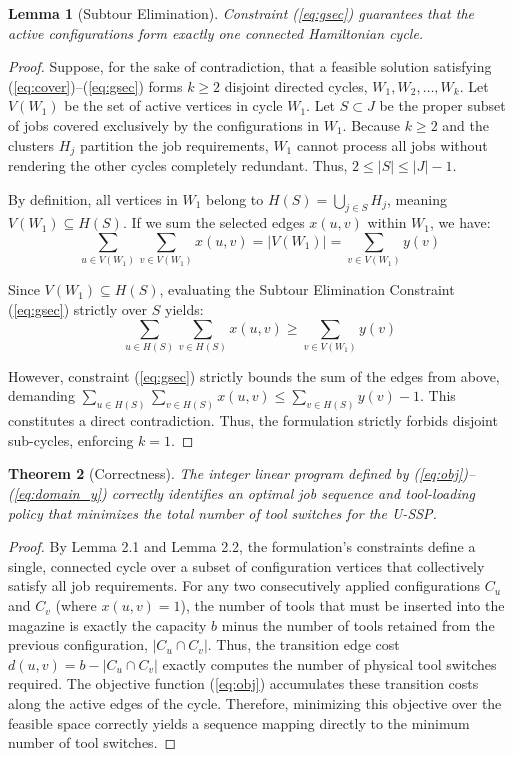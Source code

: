 \documentclass[12pt]{article}
\newtheorem{theorem}{Theorem}[section]
\newtheorem{lemma}[theorem]{Lemma}
\begin{document}
\begin{lemma}[Subtour Elimination]
	Constraint (\ref{eq:gsec}) guarantees that the active configurations form exactly one connected Hamiltonian cycle.
\end{lemma}
\begin{proof}
	Suppose, for the sake of contradiction, that a feasible solution satisfying (\ref{eq:cover})--(\ref{eq:gsec}) forms $k \ge 2$ disjoint directed cycles, $W_1, W_2, \dots, W_k$. Let $V(W_1)$ be the set of active vertices in cycle $W_1$. Let $S \subset J$ be the proper subset of jobs covered exclusively by the configurations in $W_1$. Because $k \ge 2$ and the clusters $H_j$ partition the job requirements, $W_1$ cannot process all jobs without rendering the other cycles completely redundant. Thus, $2 \le |S| \le |J| - 1$.
	
	By definition, all vertices in $W_1$ belong to $H(S) = \bigcup_{j \in S} H_j$, meaning $V(W_1) \subseteq H(S)$. If we sum the selected edges $x(u, v)$ within $W_1$, we have:
	\begin{equation}
		\sum_{u \in V(W_1)} \sum_{v \in V(W_1)} x(u, v) = |V(W_1)| = \sum_{v \in V(W_1)} y(v)
	\end{equation}
	
	Since $V(W_1) \subseteq H(S)$, evaluating the Subtour Elimination Constraint (\ref{eq:gsec}) strictly over $S$ yields:
	\begin{equation}
		\sum_{u \in H(S)} \sum_{v \in H(S)} x(u, v) \ge \sum_{v \in V(W_1)} y(v)
	\end{equation}
	
	However, constraint (\ref{eq:gsec}) strictly bounds the sum of the edges from above, demanding $\sum_{u \in H(S)} \sum_{v \in H(S)} x(u, v) \le \sum_{v \in H(S)} y(v) - 1$. This constitutes a direct contradiction. Thus, the formulation strictly forbids disjoint sub-cycles, enforcing $k = 1$.
\end{proof}

\begin{theorem}[Correctness]
	The integer linear program defined by (\ref{eq:obj})--(\ref{eq:domain_y}) correctly identifies an optimal job sequence and tool-loading policy that minimizes the total number of tool switches for the U-SSP.
\end{theorem}
\begin{proof}
	By Lemma 2.1 and Lemma 2.2, the formulation's constraints define a single, connected cycle over a subset of configuration vertices that collectively satisfy all job requirements. For any two consecutively applied configurations $C_u$ and $C_v$ (where $x(u, v) = 1$), the number of tools that must be inserted into the magazine is exactly the capacity $b$ minus the number of tools retained from the previous configuration, $|C_u \cap C_v|$. Thus, the transition edge cost $d(u, v) = b - |C_u \cap C_v|$ exactly computes the number of physical tool switches required. The objective function (\ref{eq:obj}) accumulates these transition costs along the active edges of the cycle. Therefore, minimizing this objective over the feasible space correctly yields a sequence mapping directly to the minimum number of tool switches.
\end{proof}
	
\end{document}
